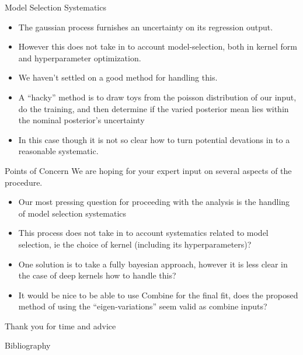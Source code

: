 \documentclass[10pt]{beamer}
\begin{document}
\begin{frame}{Model Selection Systematics}
  \begin{itemize}
  \item The gaussian process furnishes an uncertainty on its regression output.
  \item However this does not take in to account model-selection, both in kernel form and hyperparameter optimization.
  \item We haven't settled on a good method for handling this. 
  \item A ``hacky'' method is to draw toys from the poisson distribution of our input, do the training, and then determine if the varied posterior mean lies within the nominal posterior's uncertainty
  \item In this case though it is not so clear how to turn potential devations in to a reasonable systematic. 
  \end{itemize}
\end{frame}


\begin{frame}{Points of Concern}
  We are hoping for your expert input on several aspects of the procedure. 
  \begin{itemize}
  \item Our most pressing question for proceeding with the analysis is the handling of model selection systematics
  \item This process does not take in to account systematics related to model selection, ie the choice of kernel (including its hyperparameters)?
  \item One solution is to take a fully bayesian approach, however it is less clear in the case of deep kernels how to handle this? 
  \item It would be nice to be able to use Combine for the final fit, does the proposed method of using the ``eigen-variations'' seem valid as combine inputs?
  \end{itemize}
  \begin{center}
    {\Large Thank you for time and advice}
  \end{center}
\end{frame}


\begin{frame}[allowframebreaks]{Bibliography}
  
  
\end{frame}


\appendix
\end{document}
